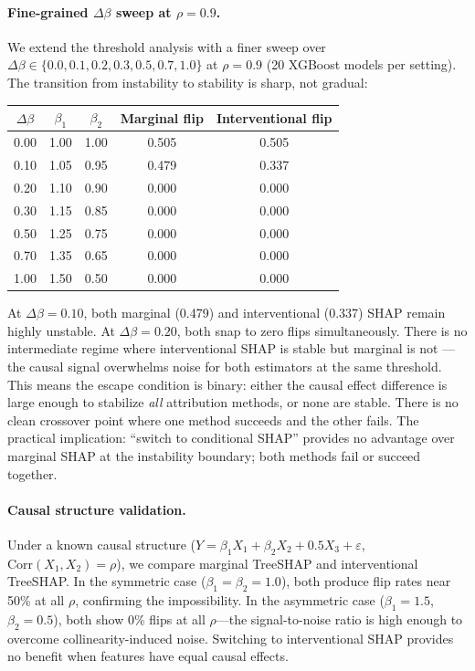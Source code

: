 \documentclass{article}
\begin{document}
\paragraph{Fine-grained $\Delta\beta$ sweep at $\rho = 0.9$.}
We extend the threshold analysis with a finer sweep over
$\Delta\beta \in \{0.0, 0.1, 0.2, 0.3, 0.5, 0.7, 1.0\}$ at
$\rho = 0.9$ (20 XGBoost models per setting).
The transition from instability to stability is sharp, not gradual:

\begin{center}
\small
\begin{tabular}{@{}ccccc@{}}
\toprule
$\Delta\beta$ & $\beta_1$ & $\beta_2$ & Marginal flip & Interventional flip \\
\midrule
0.00 & 1.00 & 1.00 & 0.505 & 0.505 \\
0.10 & 1.05 & 0.95 & 0.479 & 0.337 \\
0.20 & 1.10 & 0.90 & 0.000 & 0.000 \\
0.30 & 1.15 & 0.85 & 0.000 & 0.000 \\
0.50 & 1.25 & 0.75 & 0.000 & 0.000 \\
0.70 & 1.35 & 0.65 & 0.000 & 0.000 \\
1.00 & 1.50 & 0.50 & 0.000 & 0.000 \\
\bottomrule
\end{tabular}
\end{center}

At $\Delta\beta = 0.10$, both marginal (0.479) and interventional
(0.337) SHAP remain highly unstable. At $\Delta\beta = 0.20$,
both snap to zero flips simultaneously. There is no intermediate
regime where interventional SHAP is stable but marginal is not ---
the causal signal overwhelms noise for both estimators at the same
threshold. This means the escape condition is binary: either the
causal effect difference is large enough to stabilize \emph{all}
attribution methods, or none are stable. There is no clean crossover point where one method succeeds and the other fails. The practical implication:
``switch to conditional SHAP'' provides no advantage over marginal
SHAP at the instability boundary; both methods fail or succeed
together.

\paragraph{Causal structure validation.}
\begin{sloppypar}
Under a known causal structure ($Y = \beta_1 X_1 + \beta_2 X_2 + 0.5 X_3 + \varepsilon$,
$\text{Corr}(X_1, X_2) = \rho$), we compare marginal TreeSHAP and interventional
TreeSHAP. In the symmetric case ($\beta_1 = \beta_2 = 1.0$), both produce flip rates
near 50\% at all $\rho$, confirming the impossibility. In the asymmetric case
($\beta_1 = 1.5$, $\beta_2 = 0.5$), both show 0\% flips at all $\rho$---the
signal-to-noise ratio is high enough to overcome collinearity-induced noise.
Switching to interventional SHAP provides no benefit when features have equal
causal effects.
\end{sloppypar}
\end{document}
